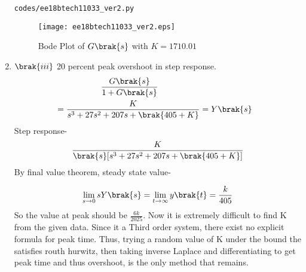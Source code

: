 \begin{enumerate}[label=\thesubsection.\arabic*.,ref=\thesubsection.\theenumi]
\begin{lstlisting}
codes/ee18btech11033_ver2.py
\end{lstlisting}

\begin{figure}[!ht]
\centering
\texttt{[image: ee18btech11033\_ver2.eps]}
\caption{Bode Plot of $G\brak{s}$ with $K= 1710.01$}
\label{fig:ee18btech11033_ver2}
\end{figure}

\item $\brak{iii}$ 20 percent peak overshoot in step response.
\\
\solution 
\begin{align}
    \frac{G\brak{s}}{1+G\brak{s}} \quad \quad \quad\quad\quad
    \\
    \ = \frac{K}{s^3 + 27s^2 + 207s + \brak{405+K}} &= Y\brak{s}
\end{align}
Step response-
\begin{align}
    \frac{K}{\brak{s}[s^3 + 27s^2 + 207s + \brak{405+K}]}
\end{align}
By final value theorem, steady state value-

\begin{align}
    \lim_{s \to 0} sY\brak{s} = \lim_{t \to \infty} y\brak{t} = \frac{k}{405}
\end{align}
So the value at peak should be $\frac{6k}{2025}$.
Now it is extremely difficult to find K  from the given data.
Since it a Third order system, there exist no explicit formula for peak time. Thus, trying a random value of K under the bound the satisfies routh hurwitz, then taking inverse Laplace and differentiating to get peak time and thus overshoot, is the only method that remains.
 
\end{enumerate}
